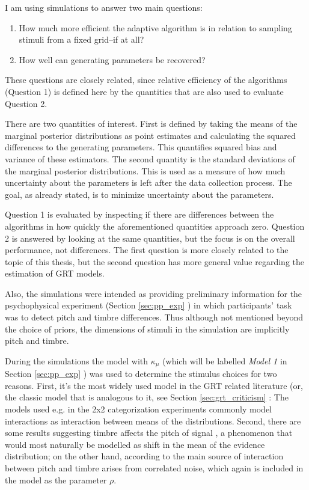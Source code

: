 \documentclass{article}\usepackage{knitr}
\begin{document}
I am using simulations to answer  two main questions: 

\begin{enumerate}
  \item How much more efficient the adaptive algorithm is in relation to sampling stimuli from a fixed grid--if at all? 
  \item How well can generating parameters be recovered?
\end{enumerate}

These questions are closely related, since relative efficiency of the algorithms (Question 1) is defined here by the quantities that are also used to evaluate Question 2. 

There are two quantities of interest. First is defined by taking the means of the marginal posterior distributions as point estimates and calculating the squared differences to the generating parameters. This quantifies squared bias and variance of these estimators. The second quantity is the standard deviations of the marginal posterior distributions. This is used as a measure of how much uncertainty about the parameters is left after the data collection process. The goal, as already stated, is to minimize uncertainty about the parameters.

Question 1 is evaluated by inspecting if there are differences between the algorithms in how quickly the aforementioned quantities approach zero. Question 2 is answered by looking at the same  quantities, but the focus is on the overall performance, not differences. The first question is more closely related to the topic of this thesis, but the second question has more general value regarding the estimation of GRT models. 

Also, the simulations were intended as providing preliminary information for the psychophysical experiment (Section \ref{sec:pp_exp} \textit{}) in which participants' task was to detect pitch and timbre differences. Thus although not mentioned beyond the choice of priors, the dimensions of stimuli in the simulation are implicitly pitch and timbre.

During the simulations the model with $\kappa_{\mu}$ (which will be labelled \textit{Model 1} in Section \ref{sec:pp_exp} \textit{}) was used to determine the stimulus choices for two reasons. First, it's the most widely used model in the GRT related literature (or, the classic model that is analogous to it, see Section \ref{sec:grt_criticism} \textit{}: The models used e.g. in the 2x2 categorization experiments commonly model interactions as interaction between means of the distributions. Second, there are some results suggesting timbre affects the pitch of signal \citep{allen2014, platt1985}, a phenomenon that would most naturally be modelled as shift in the mean of the evidence distribution; on the other hand, according to \cite{silbert2009} the main source of interaction between pitch and timbre arises from correlated noise, which again is included in the model as the parameter $\rho$.
\end{document}
